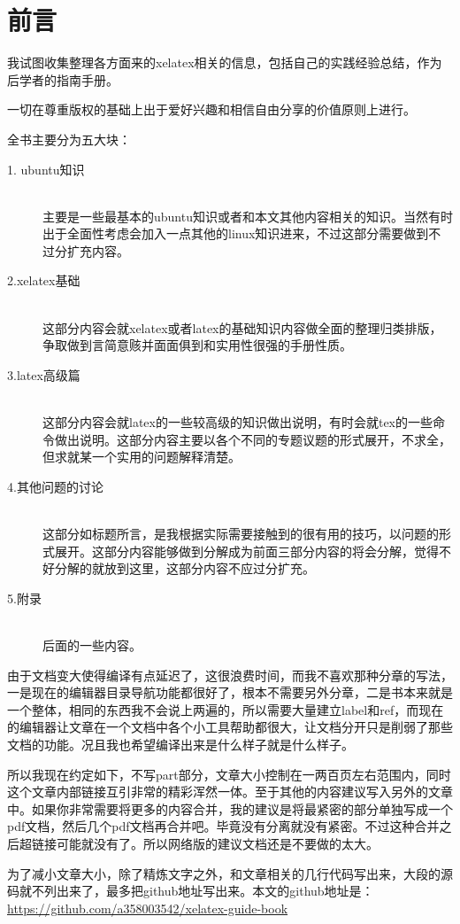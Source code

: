 \documentclass[12pt,oneside]{book}
\begin{document}
\frontmatter   

\author{万泽}
\titleLB

\chapter*{前言}
\begin{common-format}
我试图收集整理各方面来的xelatex相关的信息，包括自己的实践经验总结，作为后学者的指南手册。

一切在尊重版权的基础上出于爱好兴趣和相信自由分享的价值原则上进行。

全书主要分为五大块：
\begin{description}
\item[1. ubuntu知识] \hfill \\
主要是一些最基本的ubuntu知识或者和本文其他内容相关的知识。当然有时出于全面性考虑会加入一点其他的linux知识进来，不过这部分需要做到不过分扩充内容。
\item[2.xelatex基础] \hfill \\
这部分内容会就xelatex或者latex的基础知识内容做全面的整理归类排版，争取做到言简意赅并面面俱到和实用性很强的手册性质。
\item[3.latex高级篇] \hfill \\
这部分内容会就latex的一些较高级的知识做出说明，有时会就tex的一些命令做出说明。这部分内容主要以各个不同的专题议题的形式展开，不求全，但求就某一个实用的问题解释清楚。
\item[4.其他问题的讨论] \hfill \\
这部分如标题所言，是我根据实际需要接触到的很有用的技巧，以问题的形式展开。这部分内容能够做到分解成为前面三部分内容的将会分解，觉得不好分解的就放到这里，这部分内容不应过分扩充。
\item[5.附录] \hfill \\
后面的一些内容。
\end{description}

由于文档变大使得编译有点延迟了，这很浪费时间，而我不喜欢那种分章的写法，一是现在的编辑器目录导航功能都很好了，根本不需要另外分章，二是书本来就是一个整体，相同的东西我不会说上两遍的，所以需要大量建立label和ref，而现在的编辑器让文章在一个文档中各个小工具帮助都很大，让文档分开只是削弱了那些文档的功能。况且我也希望编译出来是什么样子就是什么样子。

所以我现在约定如下，不写part部分，文章大小控制在一两百页左右范围内，同时这个文章内部链接互引非常的精彩浑然一体。至于其他的内容建议写入另外的文章中。如果你非常需要将更多的内容合并，我的建议是将最紧密的部分单独写成一个pdf文档，然后几个pdf文档再合并吧。毕竟没有分离就没有紧密。不过这种合并之后超链接可能就没有了。所以网络版的建议文档还是不要做的太大。

为了减小文章大小，除了精炼文字之外，和文章相关的几行代码写出来，大段的源码就不列出来了，最多把github地址写出来。本文的github地址是：\\
\href{https://github.com/a358003542/xelatex-guide-book}{https://github.com/a358003542/xelatex-guide-book}


\end{common-format}
\end{document}

